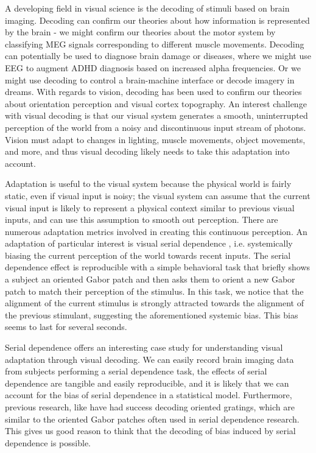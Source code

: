 \documentclass[../main.tex]{subfiles}
\begin{document}
A developing field in visual science is the decoding of stimuli based on brain imaging. Decoding can confirm our theories about how information is represented by the brain - we might confirm our theories about the motor system by classifying MEG signals corresponding to different muscle movements. Decoding can potentially be used to diagnose brain damage or diseases, where we might use EEG to augment ADHD diagnosis based on increased alpha frequencies. Or we might use decoding to control a brain-machine interface or decode imagery in dreams. With regards to vision, decoding has been used to confirm our theories about orientation perception and visual cortex topography. An interest challenge with visual decoding is that our visual system generates a smooth, uninterrupted perception of the world from a noisy and discontinuous input stream of photons. Vision must adapt to changes in lighting, muscle movements, object movements, and more, and thus visual decoding likely needs to take this adaptation into account. 

Adaptation is useful to the visual system because the physical world is fairly static, even if visual input is noisy; the visual system can assume that the current visual input is likely to represent a physical context similar to previous visual inputs, and can use this assumption to smooth out perception. There are numerous adaptation metrics involved in creating this continuous perception. An adaptation of particular interest is visual serial dependence \citep{fischer_whitney_2014}, i.e. systemically biasing the current perception of the world towards recent inputs. The serial dependence effect is reproducible with a simple behavioral task that briefly shows a subject an oriented Gabor patch and then asks them to orient a new Gabor patch to match their perception of the stimulus. In this task, we notice that the alignment of the current stimulus is strongly attracted towards the alignment of the previous stimulant, suggesting the aforementioned systemic bias. This bias seems to last for several seconds.

Serial dependence offers an interesting case study for understanding visual adaptation through visual decoding. We can easily record brain imaging data from subjects performing a serial dependence task, the effects of serial dependence are tangible and easily reproducible, and it is likely that we can account for the bias of serial dependence in a statistical model. Furthermore, previous research, like \cite{GARCIA2013515} have had success decoding oriented gratings, which are similar to the oriented Gabor patches often used in serial dependence research. This gives us good reason to think that the decoding of bias induced by serial dependence is possible.
\end{document}
